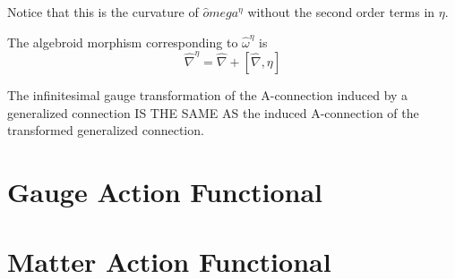 Notice that this is the curvature of $\hat omega^\eta$ without the second order terms in $\eta$.

\begin{proposition}
The algebroid morphism corresponding to $\hat \omega^\eta$ is 
\begin{equation}
    \hat \nabla^\eta = \hat \nabla + [\hat \nabla, \eta]
\end{equation}
\end{proposition}

\begin{proposition}
The infinitesimal gauge transformation of the A-connection induced by a generalized connection IS THE SAME AS the induced A-connection of the transformed generalized connection.
\end{proposition}

\section{Gauge Action Functional}

\section{Matter Action Functional}
